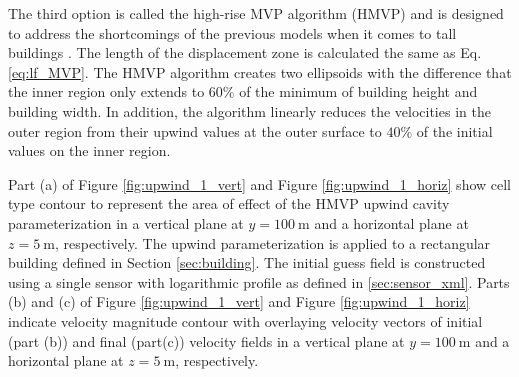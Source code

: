 The third option is called the high-rise MVP algorithm (HMVP) and is designed to address the shortcomings of the previous models when it comes to tall buildings  \cite{nelson20085}. The length of the displacement zone is calculated the same as Eq. \ref{eq:lf_MVP}. The HMVP algorithm creates two ellipsoids with the difference that the inner region only extends to $60\%$ of the minimum of building height and building width. In addition, the algorithm linearly reduces the velocities in the outer region from their upwind values at the outer surface to $40\%$ of the initial values on the inner region.

Part (a) of Figure \ref{fig:upwind_1_vert} and Figure \ref{fig:upwind_1_horiz} show cell type contour to represent the area of effect of the HMVP upwind cavity parameterization in a vertical plane at $y=100\ \si{\meter}$ and a horizontal plane at $z=5\ \si{\meter}$, respectively. The upwind parameterization is applied to a rectangular building defined in Section \ref{sec:building}. The initial guess field is constructed using a single sensor with logarithmic profile as defined in \ref{sec:sensor_xml}. Parts (b) and (c) of Figure \ref{fig:upwind_1_vert} and Figure \ref{fig:upwind_1_horiz} indicate velocity magnitude contour with overlaying velocity vectors of initial (part (b)) and final (part(c)) velocity fields in a vertical plane at $y=100\ \si{\meter}$ and a horizontal plane at $z=5\ \si{\meter}$, respectively.


